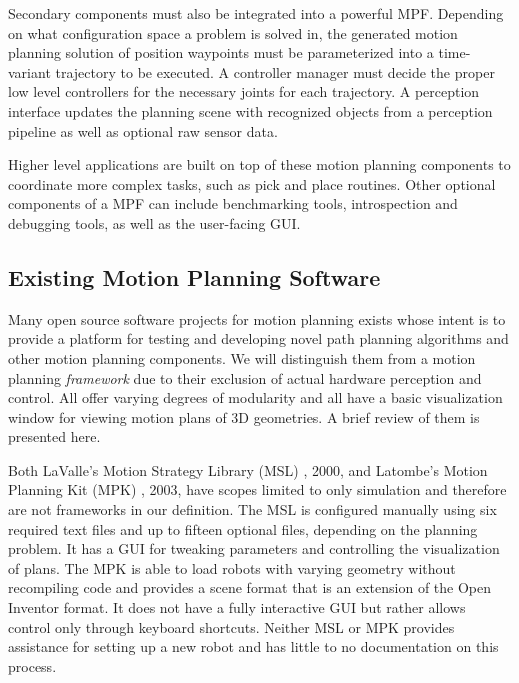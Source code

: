 \documentclass[10pt,journal,compsoc]{joser1}
\begin{document}
{Secondary components must also be integrated into a powerful MPF. Depending on
what configuration space a problem is solved in, the generated motion planning
solution of position waypoints must be parameterized into a time-variant
trajectory to be executed. A controller manager must decide the proper low level
controllers for the necessary joints for each trajectory. A perception interface
updates the planning scene with recognized objects from a perception pipeline as
well as optional raw sensor data.

Higher level applications are built on top of these motion planning components
to coordinate more complex tasks, such as pick and place routines. Other
optional components of a MPF can include benchmarking tools, introspection and
debugging tools, as well as the user-facing GUI.

\subsection{Existing Motion Planning Software}
\label{sec::existing}

Many open source software projects for motion planning exists whose intent is to
provide a platform for testing and developing novel path planning algorithms and
other motion planning components. We will distinguish them from a motion
planning \textit{framework} due to their exclusion of actual hardware perception
and control. All offer varying degrees of modularity and all have a basic
visualization window for viewing motion plans of 3D geometries. A brief review
of them is presented here.

Both LaValle's Motion Strategy Library (MSL) \cite{lavallemsl}, 2000, and
Latombe's Motion Planning Kit (MPK) \cite{mpk}, 2003, have scopes limited to
only simulation and therefore are not frameworks in our definition. The MSL is
configured manually using six required text files and up to fifteen optional
files, depending on the planning problem. It has a GUI for tweaking parameters
and controlling the visualization of plans. The MPK is able to load robots with
varying geometry without recompiling code and provides a scene format that is an
extension of the Open Inventor format. It does not have a fully interactive GUI but
rather allows control only through keyboard shortcuts. Neither MSL or MPK
provides assistance for setting up a new robot and has little to no
documentation on this process.

}
\end{document}
